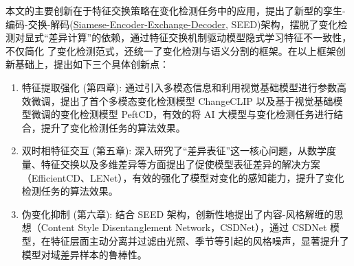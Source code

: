 本文的主要创新在于特征交换策略在变化检测任务中的应用，提出了新型的孪生-编码-交换-解码(\url{Siamese-Encoder-Exchange-Decoder}, SEED)架构，摆脱了变化检测对显式“差异计算”的依赖，通过特征交换机制驱动模型隐式学习特征不一致性，不仅简化
了变化检测范式，还统一了变化检测与语义分割的框架。在以上框架创新基础上，提出如下三个具体创新点：
\begin{enumerate}[label=(\arabic*)]
  \item  特征提取强化 (第四章): 通过引入多模态信息和利用视觉基础模型进行参数高效微调，提出了首个多模态变化检测模型 ChangeCLIP 以及基于视觉基础模型微调的变化检测模型 PeftCD，有效的将 AI 大模型与变化检测任务进行结合，提升了变化检测任务的算法效果。
  \item  双时相特征交互 (第五章): 深入研究了“差异表征”这一核心问题，从数学度量、特征交换以及多维差异等方面提出了促使模型表征差异的解决方案（EfficientCD、LENet），有效的强化了模型对变化的感知能力，提升了变化检测任务的算法效果。
  \item  伪变化抑制 (第六章): 结合 SEED 架构，创新性地提出了内容-风格解缠的思想（Content Style Disentanglement Network，CSDNet），通过 CSDNet 模型，在特征层面主动分离并过滤由光照、季节等引起的风格噪声，显著提升了模型对域差异样本的鲁棒性。
\end{enumerate}